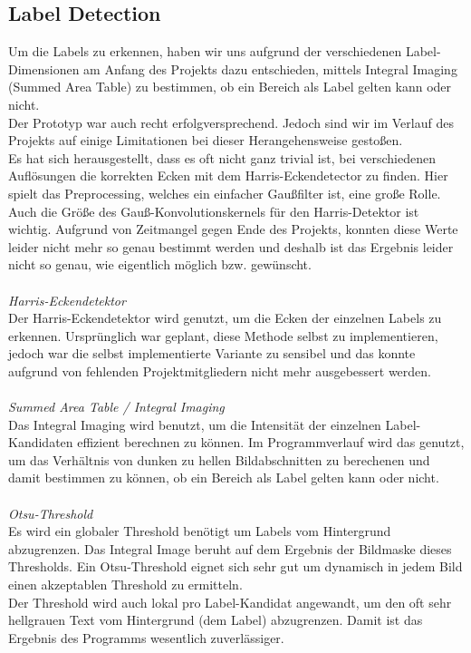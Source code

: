 \documentclass[paper=A4, deutsch]{scrartcl}
\begin{document}
\subsection{Label Detection}

Um die Labels zu erkennen, haben wir uns aufgrund der verschiedenen Label-Dimensionen am Anfang des Projekts dazu entschieden, mittels Integral Imaging (Summed Area Table) zu bestimmen, ob ein Bereich als Label gelten kann oder nicht.\\
Der Prototyp war auch recht erfolgversprechend. Jedoch sind wir im Verlauf des Projekts auf einige Limitationen bei dieser Herangehensweise gestoßen.\\
Es hat sich herausgestellt, dass es oft nicht ganz trivial ist, bei verschiedenen Auflösungen die korrekten Ecken mit dem Harris-Eckendetector zu finden. Hier spielt das Preprocessing, welches ein einfacher Gaußfilter ist, eine große Rolle. Auch die Größe des Gauß-Konvolutionskernels für den Harris-Detektor ist wichtig. Aufgrund von Zeitmangel gegen Ende des Projekts, konnten diese Werte leider nicht mehr so genau bestimmt werden und deshalb ist das Ergebnis leider nicht so genau, wie eigentlich möglich bzw. gewünscht.\\
\\

\textit{Harris-Eckendetektor} \cite{harris}\\
Der Harris-Eckendetektor wird genutzt, um die Ecken der einzelnen Labels zu erkennen.
Ursprünglich war geplant, diese Methode selbst zu implementieren, jedoch war die selbst implementierte Variante zu sensibel und das konnte aufgrund von fehlenden Projektmitgliedern nicht mehr ausgebessert werden.\\
\\

\textit{Summed Area Table / Integral Imaging} \cite{integralimg}\\
Das Integral Imaging wird benutzt, um die Intensität der einzelnen Label-Kandidaten effizient berechnen zu können. Im Programmverlauf wird das genutzt, um das Verhältnis von dunken zu hellen Bildabschnitten zu berechenen und damit bestimmen zu können, ob ein Bereich als Label gelten kann oder nicht.\\
\\

\textit{Otsu-Threshold} \cite{otsu}\\
Es wird ein globaler Threshold benötigt um Labels vom Hintergrund abzugrenzen. Das Integral Image beruht auf dem Ergebnis der Bildmaske dieses Thresholds. Ein Otsu-Threshold eignet sich sehr gut um dynamisch in jedem Bild einen akzeptablen Threshold zu ermitteln.\\
Der Threshold wird auch lokal pro Label-Kandidat angewandt, um den oft sehr hellgrauen Text vom Hintergrund (dem Label) abzugrenzen. Damit ist das Ergebnis des Programms wesentlich zuverlässiger.
\end{document}

